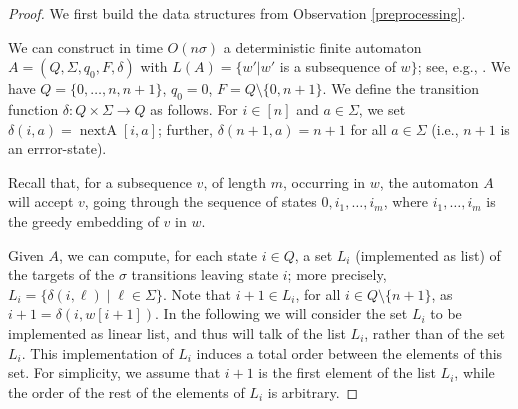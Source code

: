 \documentclass[runningheads,UKenglish,cleveref, autoref, thm-restate]{llncs}
\DeclareMathOperator{\nextpos}{nextA}
\begin{document}
\begin{proof}
We first build the data structures from Observation \ref{preprocessing}.

We can construct in time $O(n\sigma)$ a deterministic finite automaton $A = (Q,\Sigma,q_0, F, \delta)$ with $L(A) = \{w' | w'$ is a subsequence of $w\}$; see, e.g., \cite{CrochemoreMT03}. We have $Q = \{0,\ldots,n,n+1\}$, $q_0 = 0$, $F=Q\setminus \{0,n+1\}$. We define the transition function $\delta:Q\times\Sigma\rightarrow Q$ as follows. For $i\in [n]$ and $a\in \Sigma$, we set $\delta(i,a) = \nextpos[i,a]$; further, $\delta(n+1,a)=n+1$ for all $a\in \Sigma $ (i.e., $n+1$ is an errror-state).

Recall that, for a subsequence $v$, of length $m$, occurring in $w$, the automaton $A$ will accept $v$, going through the sequence of states $0, i_1, \ldots, i_m$, where $i_1, \ldots, i_m$ is the greedy embedding of $v$ in $w$. 

Given $A$, we can compute, for each state $i\in Q$, a set $L_i$ (implemented as list) of the targets of the $\sigma$ transitions leaving state $i$; more precisely, $L_i = \{\delta(i,\ell)\mid \ell \in \Sigma \}$. Note that $i+1\in L_i$, for all $i\in Q\setminus \{n+1\}$, as $i+1=\delta(i,w[i+1])$.  In the following we will consider the set $L_i$ to be implemented as linear list, and thus will talk of the list $L_i$, rather than of the set $L_i$. This implementation of $L_i$ induces a total order between the elements of this set. For simplicity, we assume that $i+1$ is the first element of the list $L_i$, while the order of the rest of the elements of $L_i$ is arbitrary. 



\end{proof}
\end{document}
